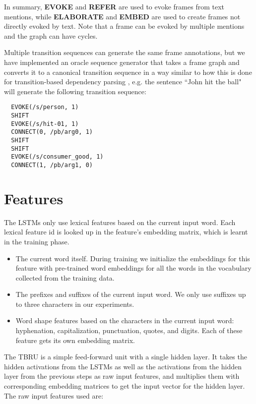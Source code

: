\documentclass[11pt,a4paper]{article}
\begin{document}
In summary, {\bf EVOKE} and {\bf REFER} are used to evoke frames from text mentions,
while {\bf ELABORATE} and {\bf EMBED} are used to create frames not directly evoked by text.
Note that a frame can be evoked by multiple mentions and the graph can have cycles.

Multiple transition sequences can generate the same frame annotations, but we
have implemented an oracle sequence generator that takes a frame graph and converts
it to a canonical transition sequence in a way similar to how this is done
for transition-based dependency parsing \cite{nivre2006}, e.g. the sentence
``John hit the ball" will generate the following transition sequence:
\begin{verbatim}
  EVOKE(/s/person, 1)
  SHIFT
  EVOKE(/s/hit-01, 1)
  CONNECT(0, /pb/arg0, 1)
  SHIFT
  SHIFT
  EVOKE(/s/consumer_good, 1)
  CONNECT(1, /pb/arg1, 0)
\end{verbatim}

\section{Features}
\label{sec:features}

The LSTMs only use lexical features based on the current input word.
Each lexical feature id is looked up in the feature's embedding matrix, which
is learnt in the training phase.

\begin{itemize}
  \item The current word itself. During training we initialize the embeddings
   for this feature with pre-trained word embeddings \cite{mikolov2013} for all
   the words in the vocabulary collected from the training data.
  \item The prefixes and suffixes of the current input word. We only use
  suffixes up to three characters in our experiments.
  \item Word shape features based on the characters in the current input word:
  hyphenation, capitalization, punctuation, quotes, and digits. Each of these
  feature gets its own embedding matrix.
\end{itemize}

The TBRU is a simple feed-forward unit with a single hidden layer. 
It takes the hidden activations from the LSTMs as well as the
activations from the hidden layer from the previous steps
as raw input features, and multiplies them with corresponding embedding matrices to get
the input vector for the hidden layer. The raw input features used are:
\end{document}
